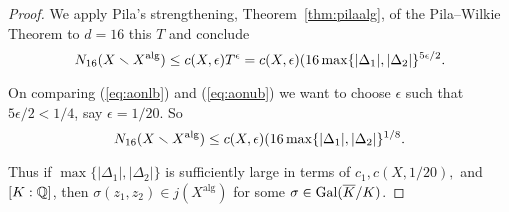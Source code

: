 \begin{proof}
  We apply Pila's strengthening, Theorem~\ref{thm:pilaalg},  of the
  Pila--Wilkie Theorem to $d=16$ this $T$ and conclude
  \begin{equation}
    \label{eq:aonub}
    N_{16}(X\smallsetminus X^{\mathrm{alg}}) \le c(X,\epsilon) T^\epsilon
    = c(X,\epsilon) (16\max\{|\Delta_1|,|\Delta_2|\}^{5\epsilon/2}.
  \end{equation}

  On comparing (\ref{eq:aonlb}) and (\ref{eq:aonub}) we want to 
  choose $\epsilon$ such that $5\epsilon/2
  <1/4$, say $\epsilon = 1/20$.
  So
  \begin{equation*}
    N_{16}(X\smallsetminus X^{\mathrm{alg}}) \le
     c(X,\epsilon) (16\max\{|\Delta_1|,|\Delta_2|\}^{1/8}.
   \end{equation*}
   
  Thus if
  $\max\{|\Delta_1|,|\Delta_2|\}$ is sufficiently large in terms of
  $c_1,c(X,1/20),$ and $[K:{\mathbb{Q}}]$, then  $\sigma(z_1,z_2) \in
  j(X^{\mathrm{alg}})$ for some $\sigma\in \mathrm{Gal}(\overline{K}/K)$.  
\end{proof}

